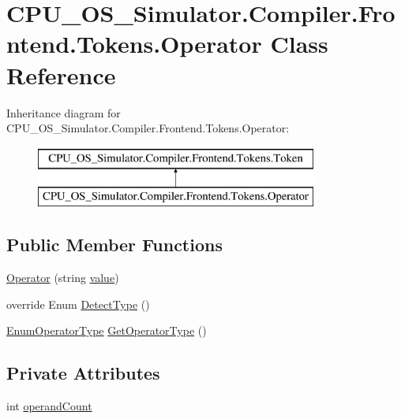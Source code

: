 \hypertarget{class_c_p_u___o_s___simulator_1_1_compiler_1_1_frontend_1_1_tokens_1_1_operator}{}\section{C\+P\+U\+\_\+\+O\+S\+\_\+\+Simulator.\+Compiler.\+Frontend.\+Tokens.\+Operator Class Reference}
\label{class_c_p_u___o_s___simulator_1_1_compiler_1_1_frontend_1_1_tokens_1_1_operator}
Inheritance diagram for C\+P\+U\+\_\+\+O\+S\+\_\+\+Simulator.\+Compiler.\+Frontend.\+Tokens.\+Operator\+:\begin{figure}[H]
\begin{center}
\leavevmode
\includegraphics[height=2.000000cm]{class_c_p_u___o_s___simulator_1_1_compiler_1_1_frontend_1_1_tokens_1_1_operator}
\end{center}
\end{figure}
\subsection*{Public Member Functions}
\begin{DoxyCompactItemize}
\item 
\hyperlink{class_c_p_u___o_s___simulator_1_1_compiler_1_1_frontend_1_1_tokens_1_1_operator_a9f1b37d1fd2bf09a3eba578b23adaa81}{Operator} (string \hyperlink{class_c_p_u___o_s___simulator_1_1_compiler_1_1_frontend_1_1_tokens_1_1_token_a5c05e12850ca18be8cbfdf7e2e263324}{value})
\item 
override Enum \hyperlink{class_c_p_u___o_s___simulator_1_1_compiler_1_1_frontend_1_1_tokens_1_1_operator_a3bd6c8981e452c8abe4c4f019d78fb9b}{Detect\+Type} ()
\item 
\hyperlink{namespace_c_p_u___o_s___simulator_1_1_compiler_1_1_frontend_1_1_tokens_ac7cabb2de0258fea24dd75768143da51}{Enum\+Operator\+Type} \hyperlink{class_c_p_u___o_s___simulator_1_1_compiler_1_1_frontend_1_1_tokens_1_1_operator_af77d824a89faa9c99f9c5aaa273ce504}{Get\+Operator\+Type} ()
\end{DoxyCompactItemize}
\subsection*{Private Attributes}
\begin{DoxyCompactItemize}
\item 
int \hyperlink{class_c_p_u___o_s___simulator_1_1_compiler_1_1_frontend_1_1_tokens_1_1_operator_a96e3a4c37284e7912243d510fd958caa}{operand\+Count}
\end{DoxyCompactItemize}
